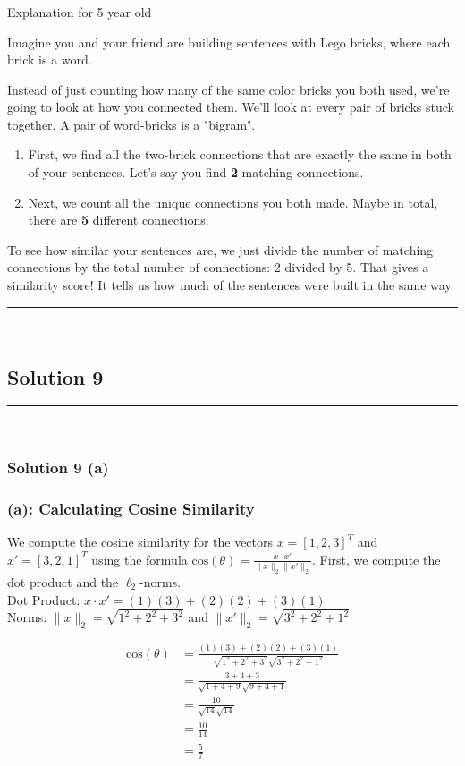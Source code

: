 \documentclass{article}
\begin{document}
\subsubsection*{\normalfont}{Explanation for 5 year old}

\parbox{\textwidth}{
Imagine you and your friend are building sentences with Lego bricks, where each brick is a word.

Instead of just counting how many of the same color bricks you both used, we're going to look at how you connected them. We'll look at every pair of bricks stuck together. A pair of word-bricks is a "bigram".

\begin{enumerate}
    \item First, we find all the two-brick connections that are exactly the same in both of your sentences. Let's say you find \textbf{2} matching connections.
    \item Next, we count all the unique connections you both made. Maybe in total, there are \textbf{5} different connections.
\end{enumerate}

To see how similar your sentences are, we just divide the number of matching connections by the total number of connections: 2 divided by 5. That gives a similarity score! It tells us how much of the sentences were built in the same way.
}

\noindent\rule{\textwidth}{0.4pt}\\

\newpage

\subsection*{Solution 9}
\noindent\rule{\textwidth}{0.4pt}\\
\subsubsection*{Solution 9 (a)}

\subsubsection*{(a): Calculating Cosine Similarity}
\parbox{\textwidth}{
We compute the cosine similarity for the vectors $x = [1, 2, 3]^T$ and $x' = [3, 2, 1]^T$ using the formula $\text{cos}(\theta) = \frac{x \cdot x'}{\|x\|_2 \|x'\|_2}$. First, we compute the dot product and the $\ell_2$-norms.
\\
Dot Product: $x \cdot x' = (1)(3) + (2)(2) + (3)(1)$
\\
Norms: $\|x\|_2 = \sqrt{1^2 + 2^2 + 3^2}$ and $\|x'\|_2 = \sqrt{3^2 + 2^2 + 1^2}$
}
\begin{align*}
    \text{cos}(\theta) &= \frac{(1)(3) + (2)(2) + (3)(1)}{\sqrt{1^2+2^2+3^2} \sqrt{3^2+2^2+1^2}} \\
    &= \frac{3 + 4 + 3}{\sqrt{1+4+9} \sqrt{9+4+1}} \\
    &= \frac{10}{\sqrt{14} \sqrt{14}} \\
    &= \frac{10}{14} \\
    &= \frac{5}{7}
\end{align*}
\end{document}
